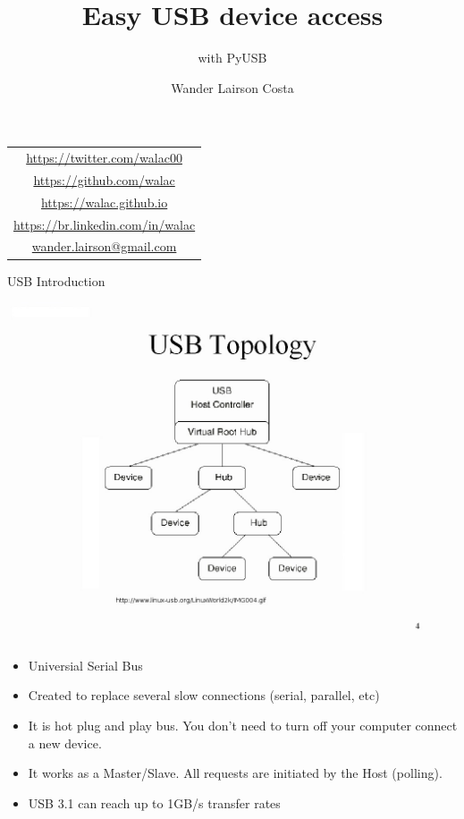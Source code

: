 \documentclass[pdf]{beamer}
\title[PyUSB]{Easy USB device access}
\subtitle{with PyUSB}
\author{{\Large Wander Lairson Costa}}
\institute{{\large Mozilla Corporation}}
\date{}
\begin{document}
\begin{frame}
  \titlepage
  \begin{center}
    \begin{tabular}{c}
      \url{https://twitter.com/walac00} \\
      \url{https://github.com/walac} \\
      \url{https://walac.github.io} \\
      \url{https://br.linkedin.com/in/walac} \\
      \href{mailto:wander.lairson@gmail.com}{wander.lairson@gmail.com} \\
    \end{tabular}
  \end{center}
\end{frame}

\begin{frame}{USB Introduction}
  \begin{center}
    \includegraphics[scale=0.15]{img/topology.jpg}
  \end{center}
  \begin{itemize}
    \tiny
    \item Universial Serial Bus
    \item Created to replace several slow connections (serial, parallel, etc)
    \item It is hot plug and play bus. You don't need to turn off your computer
        connect a new device.
    \item It works as a Master/Slave. All requests are initiated by the Host (polling).
    \item USB 3.1 can reach up to 1GB/s transfer rates
  \end{itemize}
\end{frame}
\end{document}
